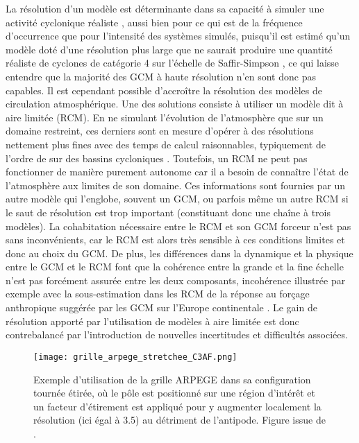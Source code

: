 \documentclass[../main.tex]{subfiles}
\begin{document}
La résolution d'un modèle est déterminante dans sa capacité à simuler une activité cyclonique réaliste \parencite{roberts_impact_2020}, aussi bien pour ce qui
est de la fréquence d'occurrence que pour l'intensité des systèmes simulés, puisqu'il est estimé qu'un modèle doté d'une résolution plus large que  ne
saurait produire une quantité réaliste de cyclones de catégorie 4 sur l'échelle de Saffir-Simpson \parencite{davis_resolving_2018}, ce qui laisse entendre que
la majorité des GCM à haute résolution n'en sont donc pas capables. Il est cependant possible d'accroître la résolution des modèles de circulation
atmosphérique. Une des solutions consiste à utiliser un modèle dit à aire limitée (RCM). En ne simulant l'évolution de l'atmosphère que sur un domaine
restreint, ces derniers sont en mesure d'opérer à des résolutions nettement plus fines avec des temps de calcul raisonnables, typiquement de l'ordre de 
sur des bassins cycloniques \parencite{redmond_projected_2015,gallo_highresolution_2019,torres-alavez_future_2021}. Toutefois, un RCM ne peut pas fonctionner de
manière purement autonome car il a besoin de connaître l'état de l'atmosphère aux limites de son domaine. Ces informations sont fournies par un autre modèle qui
l'englobe, souvent un GCM, ou parfois même un autre RCM si le saut de résolution est trop important (constituant donc une chaîne à trois modèles). La
cohabitation nécessaire entre le RCM et son GCM forceur n'est pas sans inconvénients, car le RCM est alors très sensible à ces conditions limites
\parencite{wu_estimating_2005} et donc au choix du GCM. De plus, les différences dans la dynamique et la physique entre le GCM et le RCM font que la cohérence
entre la grande et la fine échelle n'est pas forcément assurée entre les deux composants, incohérence illustrée par exemple avec la sous-estimation dans les RCM
de la réponse au forçage anthropique suggérée par les GCM sur l'Europe continentale \parencite{boe_large_2020,taranu_mechanisms_2023}. Le gain de résolution
apporté par l'utilisation de modèles à aire limitée est donc contrebalancé par l'introduction de nouvelles incertitudes et difficultés associées.

\begin{figure}[tb]
    \centering
    \texttt{[image: grille\_arpege\_stretchee\_C3AF.png]}
    \caption{Exemple d'utilisation de la grille ARPEGE dans sa configuration tournée étirée, où le pôle est positionné sur une région d'intérêt et un facteur
    d'étirement est appliqué pour y augmenter localement la résolution (ici égal à \num{3.5}) au détriment de l'antipode. Figure issue de
    \cite{chauvin_future_2020}.}
    \label{fig:rotated_streched}
\end{figure}
\end{document}
